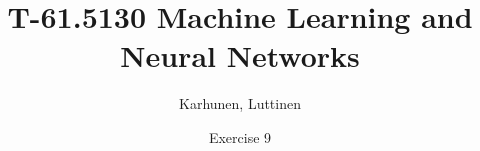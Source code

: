 
\title{T-61.5130 Machine Learning and Neural Networks}
\author{Karhunen, Luttinen}
\date{Exercise 9}

\usepackage{pdfpages}

\usepackage{subfig}


\newcommand{\vect}[1]{{\bf{#1}}}
\newcommand{\svect}[1]{\boldsymbol{#1}}
\newcommand{\matr}[1]{\boldsymbol{#1}}

\renewcommand{\vec}[1]{\mathbf{#1}}
\newcommand{\set}[1]{\mathcal{#1}}
\newcommand{\C}{\set{C}}
\newcommand{\E}{\mathcal{E}}
\newcommand{\I}{\vec{I}}
\renewcommand{\L}{\mathcal{L}}
\newcommand{\N}{\mathrm{I \negmedspace N}}
\newcommand{\R}{\mathrm{I \negmedspace R}}
\newcommand{\V}{\set{V}}
\newcommand{\W}{\vec{W}}
\newcommand{\X}{\set{X}}
\newcommand{\e}{\vec{e}}
\newcommand{\h}{\vec{h}}
\newcommand{\m}{\vec{m}}
\newcommand{\mub}{\boldsymbol{\mu}}
\newcommand{\n}{\vec{n}}
\renewcommand{\t}{\vec{t}}
\renewcommand{\u}{\vec{u}}
\renewcommand{\v}{\vec{v}}
\newcommand{\w}{\vec{w}}
\newcommand{\x}{\vec{x}}
\newcommand{\y}{\vec{y}}
\newcommand{\Y}{\vec{Y}}
\newcommand{\z}{\vec{z}}
\newcommand{\argmin}{\operatornamewithlimits{argmin}}
\newcommand{\argmax}{\operatornamewithlimits{argmax}}
\newcommand{\bSigma}{\boldsymbol{\Sigma}}





\maketitle
\thispagestyle{empty}

